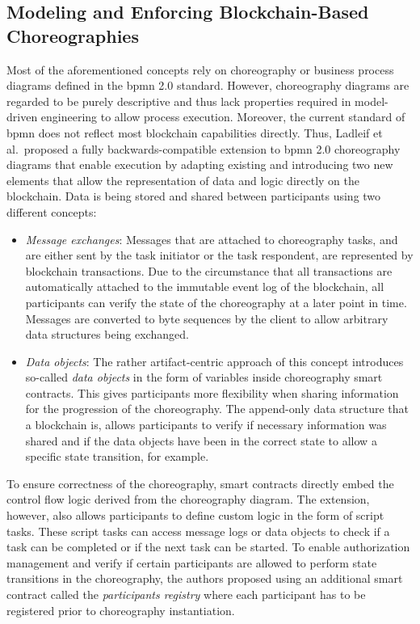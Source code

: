 \subsection{Modeling and Enforcing Blockchain-Based Choreographies~\cite{modeling_blockchain_based_choreographies}}

Most of the aforementioned concepts rely on choreography or business process diagrams defined in the \gls{bpmn} 2.0 standard. However, choreography diagrams are regarded to be purely descriptive and thus lack properties required in model-driven engineering to allow process execution. Moreover, the current standard of \gls{bpmn} does not reflect most blockchain capabilities directly. Thus, Ladleif et al.\ proposed a fully backwards-compatible extension to \gls{bpmn} 2.0 choreography diagrams that enable execution by adapting existing and introducing two new elements that allow the representation of data and logic directly on the blockchain. Data is being stored and shared between participants using two different concepts:

\begin{itemize}
    \item \textit{Message exchanges}: Messages that are attached to choreography tasks, and are either sent by the task initiator or the task respondent, are represented by blockchain transactions. Due to the circumstance that all transactions are automatically attached to the immutable event log of the blockchain, all participants can verify the state of the choreography at a later point in time. Messages are converted to byte sequences by the client to allow arbitrary data structures being exchanged.
    \item \textit{Data objects}: The rather artifact-centric approach of this concept introduces so-called \textit{data objects} in the form of variables inside choreography smart contracts. This gives participants more flexibility when sharing information for the progression of the choreography. The append-only data structure that a blockchain is, allows participants to verify if necessary information was shared and if the data objects have been in the correct state to allow a specific state transition, for example.
\end{itemize}

To ensure correctness of the choreography, smart contracts directly embed the control flow logic derived from the choreography diagram. The extension, however, also allows participants to define custom logic in the form of script tasks. These script tasks can access message logs or data objects to check if a task can be completed or if the next task can be started. To enable authorization management and verify if certain participants are allowed to perform state transitions in the choreography, the authors proposed using an additional smart contract called the \textit{participants registry} where each participant has to be registered prior to choreography instantiation.

